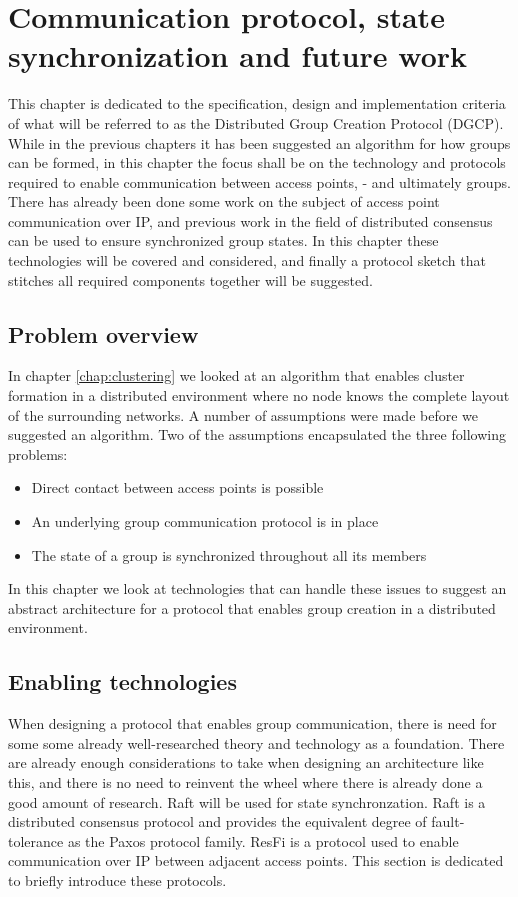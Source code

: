 \chapter{Communication protocol, state synchronization and future work}
\label{chap:proto}
This chapter is dedicated to the specification, design and implementation criteria of what will be referred to as the Distributed Group Creation Protocol (DGCP).
While in the previous chapters it has been suggested an algorithm for how groups can be formed, in this chapter the focus shall be on the technology and protocols required
to enable communication between access points, - and ultimately groups. There has already been done some work on the subject of access point communication over IP,
and previous work in the field of distributed consensus can be used to ensure synchronized group states. In this chapter these technologies will be covered and considered,
and finally a protocol sketch that stitches all required components together will be suggested. 


\section{Problem overview}
In chapter \ref{chap:clustering} we looked at an algorithm that enables cluster formation in a distributed environment where no node knows the complete layout of the surrounding networks.
A number of assumptions were made before we suggested an algorithm. Two of the assumptions encapsulated the three following problems:
\begin{itemize}
\item Direct contact between access points is possible
\item An underlying group communication protocol is in place
\item The state of a group is synchronized throughout all its members
\end{itemize}
In this chapter we look at technologies that can handle these issues to suggest an abstract architecture for a protocol that enables group creation in a distributed environment.

\section{Enabling technologies}
When designing a protocol that enables group communication, there is need for some some already well-researched theory and technology as a foundation. There are already enough
considerations to take when designing an architecture like this, and there is no need to reinvent the wheel where there is already done a good amount of research. 
Raft will be used for state synchronzation. Raft is a distributed consensus protocol and provides the equivalent degree of fault-tolerance as the Paxos \cite{lamport2001paxos} protocol family.
ResFi is a protocol used to enable communication over IP between adjacent access points. This section is dedicated to briefly introduce these protocols. 

